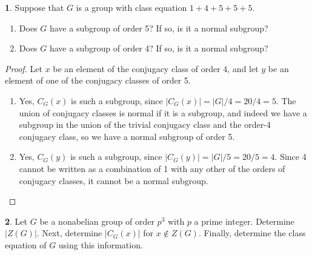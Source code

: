 \documentclass[12pt]{article}
\theoremstyle{definition}
\newtheorem{ex}{}
\begin{document}
\begin{ex}
	Suppose that $G$ is a group with class equation $1 + 4 + 5 + 5 + 5$.
	\begin{enumerate}[label=(\alph*)]
		\item Does $G$ have a subgroup of order 5? If so, is it a normal subgroup?
		\item Does $G$ have a subgroup of order 4? If so, is it a normal subgroup?
	\end{enumerate}
\end{ex}
\begin{proof}
  Let $x$ be an element of the conjugacy class of order 4, and let $y$ be an element of one of the conjugacy classes of order 5.
  \begin{enumerate}[label=(\alph*)]
    \item Yes, $C_G(x)$ is such a subgroup, since $|C_G(x)| = |G|/4 = 20/4 = 5$.
      The union of conjugacy classes is normal if it is a subgroup, and indeed we have a subgroup in the union of the trivial conjugacy class and the order-4 conjugacy class, so we have a normal subgroup of order 5.
    \item Yes, $C_G(y)$ is such a subgroup, since $|C_G(y)| = |G|/5 = 20/5 = 4$.
      Since 4 cannot be written as a combination of 1 with any other of the orders of conjugacy classes, it cannot be a normal subgroup.
  \end{enumerate}
\end{proof}

\begin{ex}
	Let $G$ be a nonabelian group of order $p^3$ with $p$ a prime integer.
	Determine $|Z(G)|$.
	Next, determine $|C_G(x)|$ for $x \notin Z(G)$.
	Finally, determine the class equation of $G$ using this information.
\end{ex}
\end{document}
